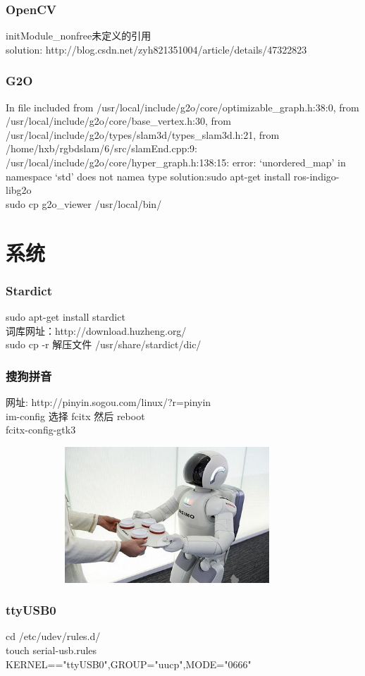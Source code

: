 \documentclass{beamer}
\begin{document}
\begin{CJK}{UTF8}{gkai}
 \begin{frame}\frametitle{OpenCV}
     initModule\_nonfree未定义的引用\\
     solution: http://blog.csdn.net/zyh821351004/article/details/47322823
 \end{frame}

 \begin{frame}\frametitle{G2O}
     In file included from /usr/local/include/g2o/core/optimizable\_graph.h:38:0,
                from /usr/local/include/g2o/core/base\_vertex.h:30,
                from /usr/local/include/g2o/types/slam3d/types\_slam3d.h:21,
                from /home/hxb/rgbdslam/6/src/slamEnd.cpp:9:
     /usr/local/include/g2o/core/hyper\_graph.h:138:15: error:
     ‘unordered\_map’ in namespace ‘std’ does not namea type
   solution:sudo apt-get install ros-indigo-libg2o\\
   sudo cp g2o\_viewer /usr/local/bin/
 \end{frame}

\section{系统}

 \begin{frame}\frametitle{Stardict}
   sudo apt-get install stardict\\
   词库网址：http://download.huzheng.org/\\
   sudo cp -r 解压文件 /usr/share/stardict/dic/
 \end{frame}

 \begin{frame}\frametitle{搜狗拼音}
   网址: http://pinyin.sogou.com/linux/?r=pinyin\\
   im-config 选择 fcitx 然后 reboot\\
   fcitx-config-gtk3\\
   \begin{figure}
     \centering
     \includegraphics[width=10.00cm,height=5.10cm]{test.png}
   \end{figure}
 \end{frame}

 \begin{frame}\frametitle{ttyUSB0}
   cd /etc/udev/rules.d/ \\
   touch serial-usb.rules\\
    KERNEL=="ttyUSB0",GROUP="uucp",MODE="0666"
 \end{frame}



\end{CJK}
\end{document}
